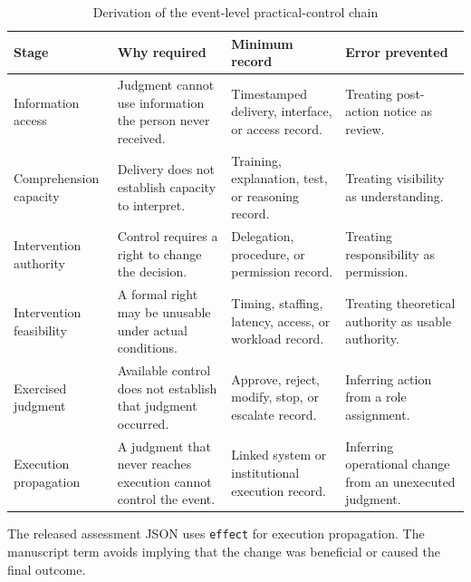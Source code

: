 
\begin{table}[t]
\centering
\begin{threeparttable}
\caption{Derivation of the event-level practical-control chain}
\label{tab:construct-derivation}
\footnotesize
\begin{tabularx}{\linewidth}{l X X X}
\toprule
Stage & Why required & Minimum record & Error prevented \\
\midrule
Information access & Judgment cannot use information the person never received. & Timestamped delivery, interface, or access record. & Treating post-action notice as review. \\
Comprehension capacity & Delivery does not establish capacity to interpret. & Training, explanation, test, or reasoning record. & Treating visibility as understanding. \\
Intervention authority & Control requires a right to change the decision. & Delegation, procedure, or permission record. & Treating responsibility as permission. \\
Intervention feasibility & A formal right may be unusable under actual conditions. & Timing, staffing, latency, access, or workload record. & Treating theoretical authority as usable authority. \\
Exercised judgment & Available control does not establish that judgment occurred. & Approve, reject, modify, stop, or escalate record. & Inferring action from a role assignment. \\
Execution propagation & A judgment that never reaches execution cannot control the event. & Linked system or institutional execution record. & Inferring operational change from an unexecuted judgment. \\
\bottomrule
\end{tabularx}
\begin{tablenotes}[flushleft]\footnotesize
\item The released assessment JSON uses \texttt{effect} for execution propagation. The manuscript term avoids implying that the change was beneficial or caused the final outcome.
\end{tablenotes}
\end{threeparttable}
\end{table}


